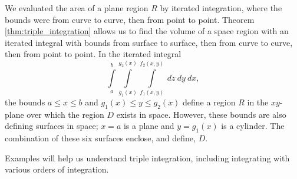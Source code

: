 	\checkoddpage
{}


We evaluated the area of a plane region $R$ by iterated integration, where the bounds were from curve to curve, then from point to point. Theorem \ref{thm:triple_integration} allows us to find the volume of a space region with an iterated integral with bounds from surface to surface, then from curve to curve, then from point to point. In the iterated integral 
$$\int\limits_a^b\int\limits_{g_1(x)}^{g_2(x)}\int\limits_{f_1(x,y)}^{f_2(x,y)} \ dz\ dy\ dx,$$
the bounds $a\leq x\leq b$ and $g_1(x)\leq y\leq g_2(x)$ define a region $R$ in the $xy$-plane over which the region $D$ exists in space. However, these bounds are also defining surfaces in space; $x=a$ is a plane and $y=g_1(x)$ is a cylinder. The combination of these six surfaces enclose, and define, $D$.

Examples will help us understand triple integration, including integrating with various orders of integration.


